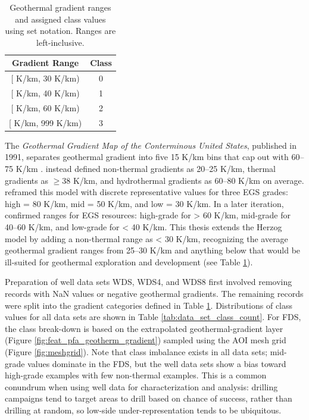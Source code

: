 \begin{table}
\centering
\begin{tabular}{|c|c|}
\hline
\textbf{Gradient Range} & \textbf{Class} \\ \hline
{[}\;0 K/km, 30 K/km)     & 0                    \\ \hline
{[}\;30 K/km, 40 K/km)    & 1                    \\ \hline
{[}\;40 K/km, 60 K/km)    & 2                    \\ \hline
{[}\;60 K/km, 999 K/km)   & 3                    \\ \hline
\end{tabular}
\singlespacing
\caption[Geothermal gradient classes]{Geothermal gradient ranges and assigned class values using set notation. Ranges are left-inclusive.}
\label{tab:geothermal_gradient_classes}
\end{table}

The \textit{Geothermal Gradient Map of the Conterminous United States}, published in 1991, separates geothermal gradient into five 15 K/km bins that cap out with 60--75
K/km \citep{lanl_geothermal_1991}. \citet{armstead_heat_1987} instead defined non-thermal gradients as 20--25 K/km, thermal gradients as $\geq38$ K/km, and hydrothermal gradients as 60--80 K/km on average. \citet{tester_economic_1990} reframed this model with discrete representative values for three EGS grades: high = 80 K/km, mid = 50 K/km, and low = 30 K/km. In a later iteration, \citet{herzog_economic_1997} confirmed ranges for EGS resources: high-grade for > 60 K/km, mid-grade for 40--60 K/km, and low-grade for < 40 K/km. This thesis extends the Herzog model by adding a non-thermal range as < 30 K/km, recognizing the average geothermal gradient ranges from 25--30 K/km and anything below that would be ill-suited for geothermal exploration and development (see Table \ref{tab:geothermal_gradient_classes}).

Preparation of well data sets WDS, WDS4, and WDS8 first involved removing records with NaN values or negative geothermal gradients. The remaining records were split into the gradient categories defined in Table \ref{tab:geothermal_gradient_classes}. Distributions of class values for all data sets are shown in Table \ref{tab:data_set_class_count}. For FDS, the class break-down is based on the extrapolated \citet{bielicki_hydrogeolgic_2015} geothermal-gradient layer (Figure \ref{fig:feat_pfa_geotherm_gradient}) sampled using the AOI mesh grid (Figure \ref{fig:meshgrid}). Note that class imbalance exists in all data sets; mid-grade values dominate in the FDS, but the well data sets show a bias toward high-grade examples with few non-thermal examples. This is a common conundrum when using well data for characterization and analysis: drilling campaigns tend to target areas to drill based on chance of success, rather than drilling at random, so low-side under-representation tends to be ubiquitous.  

